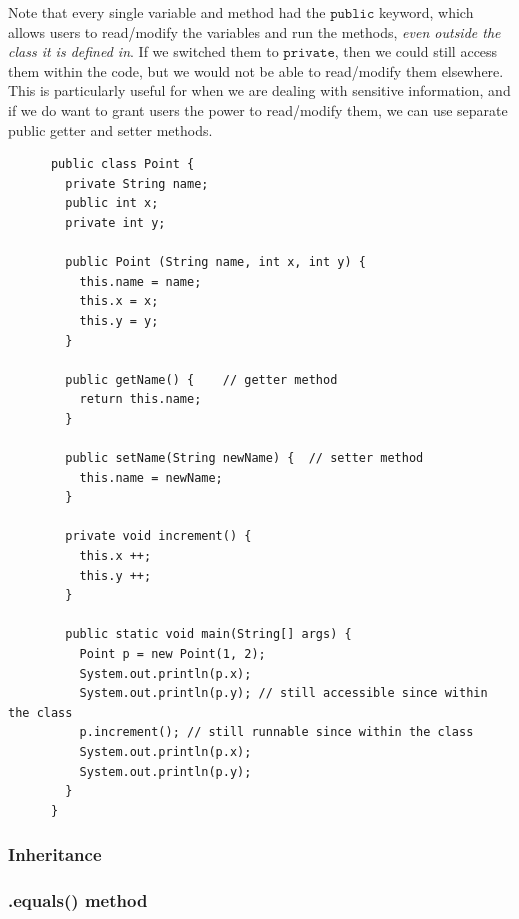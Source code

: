 \documentclass{article}
\begin{document}
      Note that every single variable and method had the $\texttt{public}$ keyword, which allows users to read/modify the variables and run the methods, \textit{even outside the class it is defined in}. If we switched them to $\texttt{private}$, then we could still access them within the code, but we would not be able to read/modify them elsewhere. This is particularly useful for when we are dealing with sensitive information, and if we do want to grant users the power to read/modify them, we can use separate public getter and setter methods. 
      \begin{lstlisting}
      public class Point {
        private String name; 
        public int x; 
        private int y;  

        public Point (String name, int x, int y) {
          this.name = name; 
          this.x = x; 
          this.y = y; 
        }
        
        public getName() {    // getter method 
          return this.name; 
        }
        
        public setName(String newName) {  // setter method 
          this.name = newName; 
        }

        private void increment() {
          this.x ++; 
          this.y ++; 
        }

        public static void main(String[] args) {
          Point p = new Point(1, 2); 
          System.out.println(p.x); 
          System.out.println(p.y); // still accessible since within the class 
          p.increment(); // still runnable since within the class 
          System.out.println(p.x); 
          System.out.println(p.y);
        }
      }
      \end{lstlisting}

    \subsubsection{Inheritance}

    \subsubsection{.equals() method}
\end{document}
